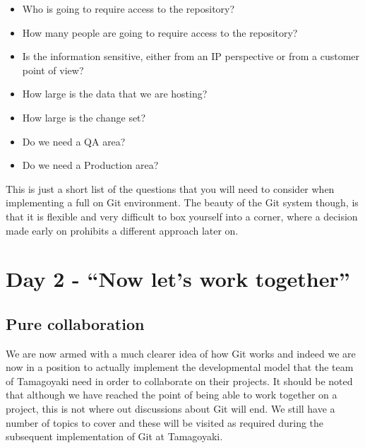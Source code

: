 \begin{itemize}
\item Who is going to require access to the repository?
\item How many people are going to require access to the repository?
\item Is the information sensitive, either from an IP perspective or from a customer point of view?
\item How large is the data that we are hosting?
\item How large is the change set?
\item Do we need a QA area?
\item Do we need a Production area?
\end{itemize}

This is just a short list of the questions that you will need to consider when implementing a full on Git environment.  The beauty of the Git system though, is that it is flexible and very difficult to box yourself into a corner, where a decision made early on prohibits a different approach later on.

\section{Day 2 - ``Now let's work together''}
\subsection{Pure collaboration}

We are now armed with a much clearer idea of how Git works and indeed we are now in a position to actually implement the developmental model that the team of Tamagoyaki need in order to collaborate on their projects.  It should be noted that although we have reached the point of being able to work together on a project, this is not where out discussions about Git will end.  We still have a number of topics to cover and these will be visited as required during the subsequent implementation of Git at Tamagoyaki.

